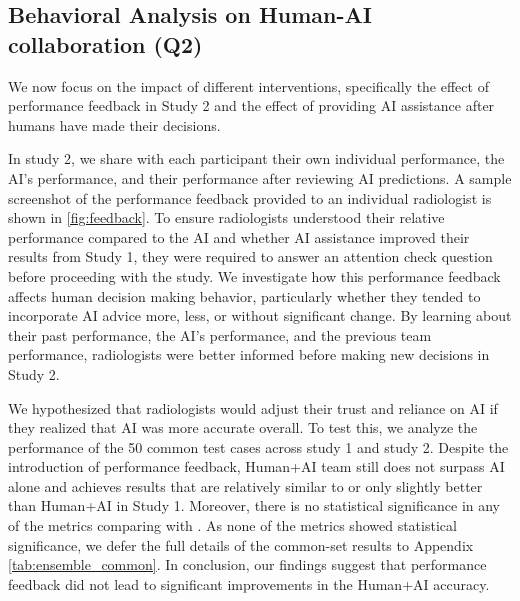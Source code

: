 \subsection{Behavioral Analysis on Human-AI collaboration (Q2)}


We now focus on the impact of different interventions, specifically the effect of performance feedback in Study 2 and the effect of providing AI assistance after humans have made their decisions.

 In study 2, we share with each participant their own individual performance, the AI's performance, and their performance after reviewing AI predictions. 
A sample screenshot of the performance feedback provided to an individual radiologist is shown in \cref{fig:feedback}. 
To ensure radiologists understood their relative performance compared to the AI and whether AI assistance improved their results from Study 1, they were required to answer an attention check question before proceeding with the study.
We investigate how this performance feedback affects human decision making behavior, particularly whether they tended to incorporate AI advice more, less, or without significant change.
By learning about their past performance, the AI's performance, and the previous \hai team performance, radiologists were better informed before making new decisions in Study 2.

We hypothesized that radiologists would adjust their trust and reliance on AI if they realized that AI was more accurate overall. 
To test this, we analyze the performance of the 50 common test cases across study 1 and study 2. 
Despite the introduction of performance feedback, Human+AI team still does not surpass AI alone and achieves results that are relatively similar to or only slightly better than Human+AI in Study 1.
Moreover, there is no statistical significance in any of the metrics comparing \hai[2] with \hai[1]. 
As none of the metrics showed statistical significance, we defer the full details of the common-set results to Appendix \cref{tab:ensemble_common}. 
In conclusion, our findings suggest that performance feedback did not lead to significant improvements in the Human+AI accuracy.





